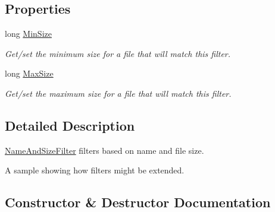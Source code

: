 \subsection*{Properties}
\begin{DoxyCompactItemize}
\item 
long \hyperlink{class_i_c_sharp_code_1_1_sharp_zip_lib_1_1_core_1_1_name_and_size_filter_a9c45936224f43746c84a242bf7b7676e}{Min\+Size}
\begin{DoxyCompactList}\small\item\em Get/set the minimum size for a file that will match this filter. \end{DoxyCompactList}\item 
long \hyperlink{class_i_c_sharp_code_1_1_sharp_zip_lib_1_1_core_1_1_name_and_size_filter_adcf2885c8da0b3433fe7de21a233e4ae}{Max\+Size}
\begin{DoxyCompactList}\small\item\em Get/set the maximum size for a file that will match this filter. \end{DoxyCompactList}\end{DoxyCompactItemize}


\subsection{Detailed Description}
\hyperlink{class_i_c_sharp_code_1_1_sharp_zip_lib_1_1_core_1_1_name_and_size_filter}{Name\+And\+Size\+Filter} filters based on name and file size. 

A sample showing how filters might be extended.

\subsection{Constructor \& Destructor Documentation}
\mbox{\label{class_i_c_sharp_code_1_1_sharp_zip_lib_1_1_core_1_1_name_and_size_filter_a79b6320156041b90e0b8d863cb78217b}} 

